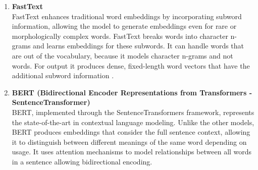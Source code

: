 \documentclass[\myFontSize,oneside,english,hidelinks,a4paper]{article}
\begin{document}
\begin{enumerate}
\item \textbf{FastText}\\
FastText enhances traditional word embeddings by incorporating subword information, allowing the model to generate embeddings even for rare or morphologically complex words. FastText breaks words into character n-grams and learns embeddings for these subwords. It can handle words that are out of the vocabulary, because it models character n-grams and not words. For output it produces dense, fixed-length word vectors that have the additional subword information \cite{Yan2024}.


\item \textbf{BERT (Bidirectional Encoder Representations from Transformers - SentenceTransformer)}\\
BERT, implemented through the SentenceTransformers framework, represents the state-of-the-art in contextual language modeling. Unlike the other models, BERT produces embeddings that consider the full sentence context, allowing it to distinguish between different meanings of the same word depending on usage. It uses attention mechanisms to model relationships between all words in a sentence allowing bidirectional encoding.



%


\end{enumerate}
\end{document}

